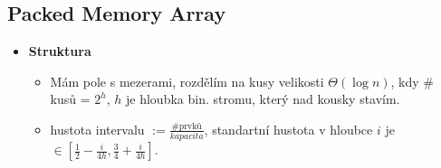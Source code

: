 \documentclass[11pt,a4paper]{article}
\begin{document}
\subsection{Packed Memory Array}
\begin{itemize}
    \item \textbf{Struktura}
    \begin{itemize}
        \item Mám pole s mezerami, rozdělím na kusy velikosti $\Theta(\log n)$, kdy $\#$ kusů = $2^h$, $h$ je hloubka bin. stromu, který nad kousky stavím.
        \item hustota intervalu $:= \frac{\text{\# prvků}}{kapacita}$, standartní hustota v hloubce $i$ je $\in [\frac{1}{2} - \frac{i}{4h}, \frac{3}{4} + \frac{i}{4h}]$.
    \end{itemize}


\end{itemize}
\end{document}

